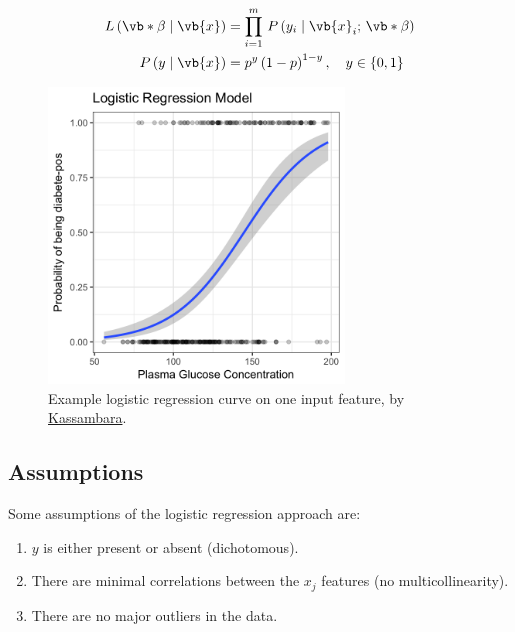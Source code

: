 \begin{subequations} \label{eq:logistic:L_Pr}
\begin{align}
L\left(\vb*{\beta} \mid \vb{x}\right) &= \prod_{i=1}^{m} \, P\left(y_{i} \mid \vb{x}_{i};\,\vb*{\beta}\right) \label{eq:logistic:L} \\
P\left(y \mid \vb{x}\right) &= p^y\left(1-p\right)^{1-y}, \quad y \in \{0, 1\} \label{eq:logistic:Pr}
\end{align}
\end{subequations}

\begin{figure}
\centering
\includegraphics[width=0.7\textwidth]{figures/ml/logistic-regression-probabilities-curve.png}
\caption{
Example logistic regression curve on one input feature, by \href{http://www.sthda.com/english/articles/36-classification-methods-essentials/151-logistic-regression-essentials-in-r/}{Kassambara}.
}
\label{fig:logistic_regression_ex}
\end{figure}

\subsection{Assumptions}
\label{class:logistic:assumptions}

Some assumptions of the logistic regression approach are:
\begin{enumerate}[noitemsep]
  \item $y$ is either present or absent (dichotomous).
  \item There are minimal correlations between the $x_{j}$ features (no multicollinearity).
  \item There are no major outliers in the data.
\end{enumerate}

